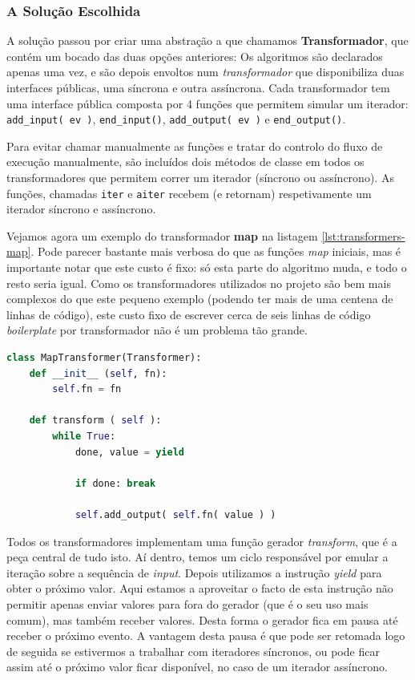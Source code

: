 \subsubsection{A Solução Escolhida}
A solução passou por criar uma abstração a que chamamos \textbf{Transformador}, que contém um bocado das duas opções anteriores: Os algoritmos são declarados apenas uma vez, e são depois envoltos num \textit{transformador} que disponibiliza duas interfaces públicas, uma síncrona e outra assíncrona. Cada transformador tem uma interface pública composta por 4 funções que permitem simular um iterador: \verb|add_input( ev )|, \verb|end_input()|, \verb|add_output( ev )| e \verb|end_output()|.

Para evitar chamar manualmente as funções e tratar do controlo do fluxo de execução manualmente, são incluídos dois métodos de classe em todos os transformadores que permitem correr um iterador (síncrono ou assíncrono). As funções, chamadas \texttt{iter} e \texttt{aiter} recebem (e retornam) respetivamente um iterador síncrono e assíncrono.

Vejamos agora um exemplo do transformador \textbf{map} na listagem \ref{lst:transformers-map}. Pode parecer bastante mais verbosa do que as funções \textit{map} iniciais, mas é importante notar que este custo é fixo: só esta parte do algoritmo muda, e todo o resto seria igual. Como os transformadores utilizados no projeto são bem mais complexos do que este pequeno exemplo (podendo ter mais de uma centena de linhas de código), este custo fixo de escrever cerca de seis linhas de código \textit{boilerplate} por transformador não é um problema tão grande.

\begin{lstlisting}[caption={Implementação da função \texttt{map} usando a nossa abordagem de transformadores},label={lst:transformers-map},language=Python]
class MapTransformer(Transformer):
    def __init__ (self, fn):
        self.fn = fn
    
    def transform ( self ):
        while True:
            done, value = yield

            if done: break
            
            self.add_output( self.fn( value ) )
\end{lstlisting}

Todos os transformadores implementam uma função gerador \textit{transform}, que é a peça central de tudo isto. Aí dentro, temos um ciclo responsável por emular a iteração sobre a sequência de \textit{input}. Depois utilizamos a instrução \textit{yield} para obter o próximo valor. Aqui estamos a aproveitar o facto de esta instrução não permitir apenas enviar valores para fora do gerador (que é o seu uso mais comum), mas também receber valores. Desta forma o gerador fica em pausa até receber o próximo evento. A vantagem desta pausa é que pode ser retomada logo de seguida se estivermos a trabalhar com iteradores síncronos, ou pode ficar assim até o próximo valor ficar disponível, no caso de um iterador assíncrono.

